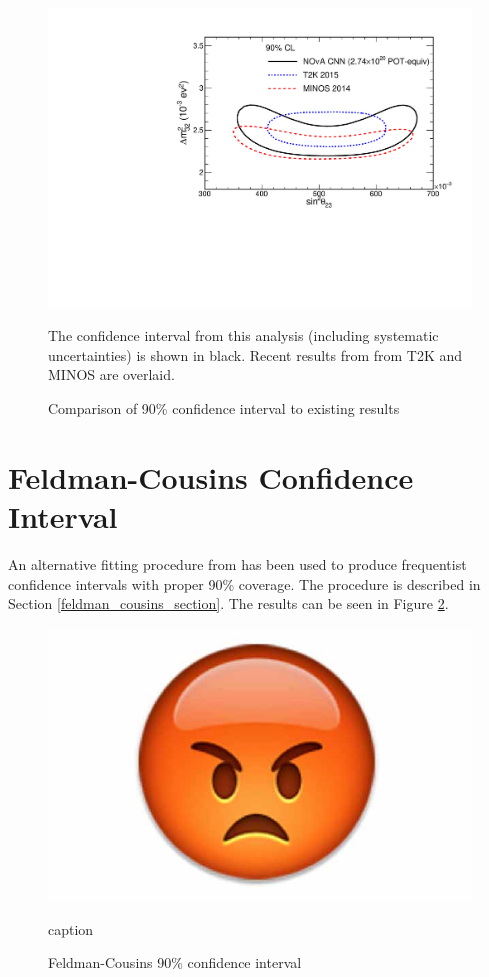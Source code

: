 \begin{figure}
\begin{center}
\includegraphics[width=\textwidth]{figures/results/fd_extrap_contour_OverlayT2KMINOS.pdf}
\end{center}
\caption{Comparison of 90\% confidence interval to existing results}{
The confidence interval from this analysis (including systematic uncertainties)
is shown in black.
Recent results from from T2K \cite{abe2015measurements} and
MINOS \cite{adamson2014combined} are overlaid.
}
\label{measured_contour_comparison}

\end{figure}

\clearpage

\section{Feldman-Cousins Confidence Interval}

An alternative fitting procedure from
\cite{feldman1998unified,backhouse2015cafana}
has been used to produce frequentist confidence intervals
with proper 90\% coverage.
The procedure is described in Section \ref{feldman_cousins_section}.
The results can be seen in Figure \ref{measured_contour_fc}.


\begin{figure}
\begin{center}
\includegraphics[width=\textwidth]{figures/dummy/dummy}
\end{center}
\caption{Feldman-Cousins 90\% confidence interval}{
caption
}
\label{measured_contour_fc}

\end{figure}

